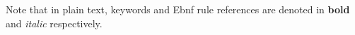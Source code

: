 Note that in plain text, keywords and Ebnf rule references are denoted in 
\textbf{bold} and \textit{italic} respectively.
